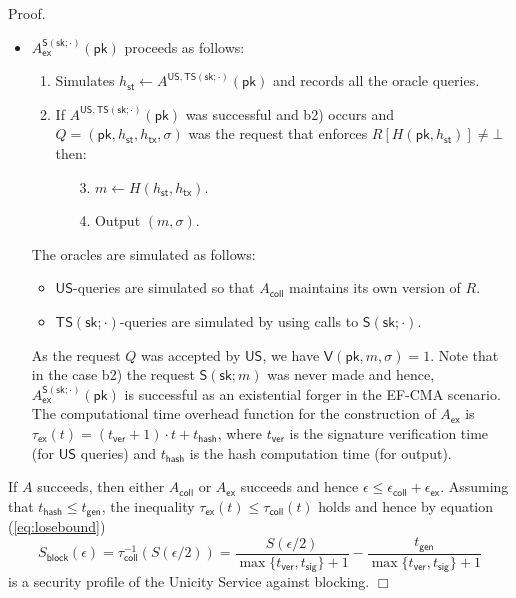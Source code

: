 \documentclass{article}
\newenvironment{proof}{\textsf{Proof}.}{\hfill$\Box$}
\newcommand{\sigver}[0]{\mathsf{V}}
\newcommand{\pubkey}[0]{\mathsf{pk}}
\newcommand{\prikey}[0]{\mathsf{sk}}
\newcommand{\unisrv}[0]{\mathsf{US}}
\begin{document}
\begin{proof}
\begin{itemize}
\item $A_\mathsf{ex}^{\mathsf{S(\prikey;\cdot)}}(\pubkey)$ proceeds as follows:
 \begin{enumerate}
  \item Simulates $h_\mathsf{st}\gets A^{\mathsf{US},\mathsf{TS}(\prikey;\cdot)}(\pubkey)$ and records all the oracle queries.
  \item If $A^{\mathsf{US},\mathsf{TS}(\prikey;\cdot)}(\pubkey)$ was successful and b2) occurs and $Q=(\pubkey, h_\mathsf{st}, h_\mathsf{tx}, \sigma)$ was the request that enforces $R[H(\pubkey, h_\mathsf{st})]\neq\bot$ then:
  \begin{enumerate}
    \item[3.] $m\gets H(h_\mathsf{st}, h_\mathsf{tx})$.
    \item[4.] Output $(m,\sigma)$.
  \end{enumerate}
 \end{enumerate}
The oracles are simulated as follows:
 \begin{itemize}
  \item $\mathsf{US}$-queries are simulated so that $A_\mathsf{coll}$ maintains its own version of $R$.
  \item $\mathsf{TS}(\prikey;\cdot)$-queries are simulated by using calls to $\mathsf{S}(\prikey;\cdot)$.
 \end{itemize}
 As the request $Q$ was accepted by $\unisrv$, we have $\sigver(\pubkey,m,\sigma)=1$. Note that in the case b2) the request $\mathsf{S}(\prikey; m)$ was never made and hence, $A_\mathsf{ex}^{\mathsf{S(\prikey;\cdot)}}(\pubkey)$ is successful as an existential forger in the EF-CMA scenario. The computational time overhead function for the construction of $A_\mathsf{ex}$ is $\tau_\mathsf{ex}(t) = (t_\mathsf{ver}+1)\cdot t + t_\mathsf{hash}$, where
$t_\mathsf{ver}$ is the signature verification time (for $\unisrv$ queries) and
$t_\mathsf{hash}$ is the hash computation time (for output).
\end{itemize}
If $A$ succeeds, then either $A_\mathsf{coll}$ or $A_\mathsf{ex}$ succeeds and hence $\epsilon \le \epsilon_\mathsf{coll} + \epsilon_\mathsf{ex}$.
Assuming that $t_\mathsf{hash}\le t_\mathsf{gen}$, the inequality
$\tau_\mathsf{ex}(t)\le \tau_\mathsf{coll}(t)$ holds and hence by equation (\ref{eq:losebound})
\[
S_\mathsf{block}(\epsilon) = \tau^{-1}_\mathsf{coll}(S(\epsilon/2)) =
\frac{S(\epsilon/2)}{\max\{t_\mathsf{ver}, t_\mathsf{sig}\}+1} - \frac{t_\mathsf{gen}}{\max\{t_\mathsf{ver}, t_\mathsf{sig}\}+1}
\]
is a security profile of the Unicity Service against blocking.
\end{proof}
\end{document}
